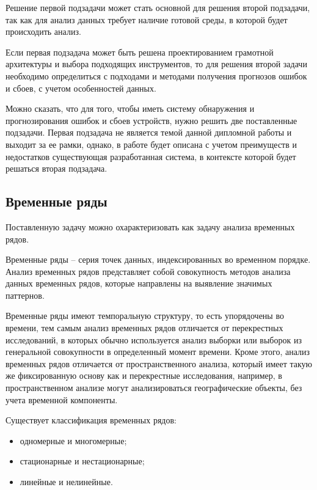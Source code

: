 Решение первой подзадачи может стать основной для решения второй подзадачи,
так как для анализ данных требует наличие готовой среды, в которой
будет происходить анализ.

Если первая подзадача может быть решена проектированием грамотной архитектуры и выбора подходящих инструментов,
то для решения второй задачи необходимо определиться с подходами и методами
получения прогнозов ошибок и сбоев, с учетом особенностей данных.

Можно сказать, что для того, чтобы иметь систему обнаружения и прогнозирования ошибок и сбоев устройств,
нужно решить две поставленные подзадачи. Первая подзадача не является темой данной дипломной работы
и выходит за ее рамки, однако, в работе будет описана с учетом преимуществ и недостатков существующая разработанная система,
в контексте которой будет решаться вторая подзадача.

\subsection{Временные ряды}



Поставленную задачу можно охарактеризовать как задачу анализа временных рядов.

Временные ряды -- серия точек данных, индексированных во временном порядке.
Анализ временных рядов представляет собой совокупность методов анализа данных временных рядов,
которые направлены на выявление значимых паттернов. \cite{box-series}

Временные ряды имеют темпоральную структуру, то есть упорядочены во времени,
тем самым анализ временных рядов отличается от перекрестных исследований,
в которых обычно используется анализ выборки или выборок из генеральной совокупности в определенный момент времени.
Кроме этого, анализ временных рядов отличается от пространственного анализа,
который имеет такую же фиксированную основу как и перекрестные исследования,
например, в пространственном анализе могут анализироваться географические объекты, без учета временной компоненты. \cite{shumway-series}

Существует классификация временных рядов: \cite{zhang-series}

\begin{itemize}
    \item одномерные и многомерные;
    \item стационарные и нестационарные;
    \item линейные и нелинейные.
\end{itemize}

